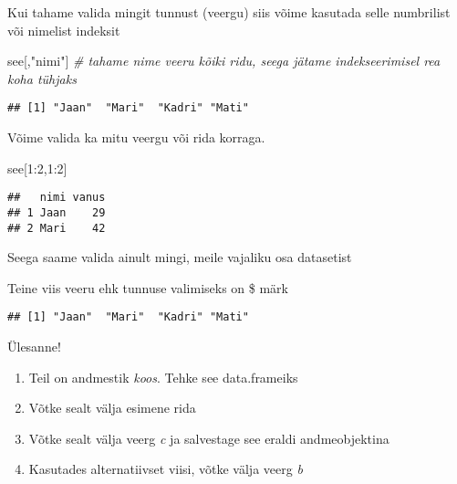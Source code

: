 \documentclass[
]{book}
\newenvironment{Shaded}{\begin{snugshade}}{\end{snugshade}}
\newcommand{\CommentTok}[1]{\textcolor[rgb]{0.56,0.35,0.01}{\textit{#1}}}
\newcommand{\DecValTok}[1]{\textcolor[rgb]{0.00,0.00,0.81}{#1}}
\newcommand{\NormalTok}[1]{#1}
\newcommand{\SpecialCharTok}[1]{\textcolor[rgb]{0.00,0.00,0.00}{#1}}
\newcommand{\StringTok}[1]{\textcolor[rgb]{0.31,0.60,0.02}{#1}}
\providecommand{\tightlist}{%
  \setlength{\itemsep}{0pt}\setlength{\parskip}{0pt}}
\begin{document}
Kui tahame valida mingit tunnust (veergu) siis võime kasutada selle numbrilist või nimelist indeksit

\begin{Shaded}
\begin{Highlighting}[]
\NormalTok{see[,}\StringTok{"nimi"}\NormalTok{] }\CommentTok{\# tahame nime veeru kõiki ridu, seega jätame indekseerimisel rea koha tühjaks }
\end{Highlighting}
\end{Shaded}

\begin{verbatim}
## [1] "Jaan"  "Mari"  "Kadri" "Mati"
\end{verbatim}

Võime valida ka mitu veergu või rida korraga.

\begin{Shaded}
\begin{Highlighting}[]
\NormalTok{see[}\DecValTok{1}\SpecialCharTok{:}\DecValTok{2}\NormalTok{,}\DecValTok{1}\SpecialCharTok{:}\DecValTok{2}\NormalTok{]}
\end{Highlighting}
\end{Shaded}

\begin{verbatim}
##   nimi vanus
## 1 Jaan    29
## 2 Mari    42
\end{verbatim}

Seega saame valida ainult mingi, meile vajaliku osa datasetist

Teine viis veeru ehk tunnuse valimiseks on \$ märk

\begin{Shaded}
\end{Shaded}

\begin{verbatim}
## [1] "Jaan"  "Mari"  "Kadri" "Mati"
\end{verbatim}

Ülesanne!

\begin{enumerate}
\def\labelenumi{\arabic{enumi}.}
\tightlist
\item
  Teil on andmestik \emph{koos}. Tehke see data.frameiks
\item
  Võtke sealt välja esimene rida
\item
  Võtke sealt välja veerg \emph{c} ja salvestage see eraldi andmeobjektina
\item
  Kasutades alternatiivset viisi, võtke välja veerg \emph{b}
\end{enumerate}
\end{document}
